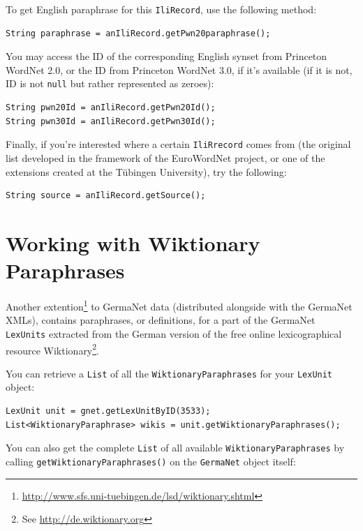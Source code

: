 \documentclass[12pt,a4paper,english,utf8]{report}
\begin{document}
To get English paraphrase for this \texttt{IliRecord}, use the following method:

\begin{lstlisting}
String paraphrase = anIliRecord.getPwn20paraphrase();
\end{lstlisting}


You may access the ID of the corresponding English synset from Princeton WordNet 2.0, or the ID from Princeton WordNet 3.0, if it's available (if it is not, ID is not \texttt{null} but rather represented as zeroes):

\begin{lstlisting}
String pwn20Id = anIliRecord.getPwn20Id();
String pwn30Id = anIliRecord.getPwn30Id();
\end{lstlisting}

Finally, if you're interested where a certain \texttt{IliRrecord} comes from (the original list developed in the framework of the EuroWordNet project, or one of the extensions created at the Tübingen University), try the following:

\begin{lstlisting}
String source = anIliRecord.getSource();
\end{lstlisting}



\section{Working with Wiktionary Paraphrases}
\label{snippetsEnd}
Another extention\footnote{\url{http://www.sfs.uni-tuebingen.de/lsd/wiktionary.shtml}} to GermaNet data (distributed alongside with the GermaNet XMLs), contains paraphrases, or definitions, for a part of the GermaNet \texttt{LexUnits} extracted from the German version of the free online lexicographical resource Wiktionary\footnote{See \href{http://de.wiktionary.org}{http://de.wiktionary.org}}.

You can retrieve a \texttt{List} of all the \texttt{WiktionaryParaphrases} for your \texttt{LexUnit} object:

\begin{lstlisting}
LexUnit unit = gnet.getLexUnitByID(3533);
List<WiktionaryParaphrase> wikis = unit.getWiktionaryParaphrases();
\end{lstlisting}

You can also get the complete \texttt{List} of all available \texttt{WiktionaryParaphrases} by calling \texttt{getWiktionaryParaphrases()} on the \texttt{GermaNet} object itself:
\end{document}
